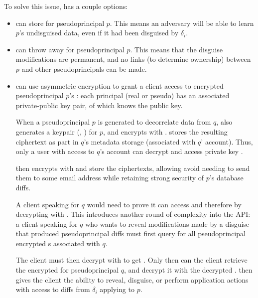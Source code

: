 To solve this issue, \sys has a couple options:
\begin{itemize}
    \item \sys can store  for pseudoprincipal $p$. This means
        an adversary will be able to learn $p$'s undisguised data, even if it had been disguised by
        $\delta_i$.

    \item \sys can throw away  for pseudoprincipal $p$. This means that the
        disguise modifications are permanent, and no links (to determine ownership) between
        $p$ and other pseudoprincipals can be made.

    \item \sys can use asymmetric encryption to grant a client access to encrypted pseudoprincipal
        $p$'s : each principal (real or pseudo) has an associated private-public
        key pair, of which \sys knows the public key. 

        When a pseudoprincipal $p$ is generated to decorrelate data from $q$, \sys also generates a
        keypair (, ) for $p$, and encrypts  with . \sys stores the
        resulting ciphertext as part in $q$'s metadata storage (\eg associated with $q$' account).
        Thus, only a user with access to $q$'s account can decrypt and access private key .

        \sys then encrypts  with  and store the ciphertexts,
        allowing \sys avoid needing to send them to some email address while retaining strong
        security of $p$'s database diffs.

        A client speaking for $q$ would need to prove it can access  and therefore
         by decrypting  with .
        This introduces another round of complexity into the API: a client speaking for $q$ who
        wants to reveal modifications made by a disguise that produced pseudoprincipal diffs must
        first query for all pseudoprincipal encrypted s associated with $q$.

        The client must then decrypt with  to get . Only then can the client
        retrieve the encrypted  for pseudoprincipal $q$, and decrypt it with the
        decrypted .  then gives the client the ability to reveal,
        disguise, or
        perform application actions with access to diffs from $\delta_i$ applying to $p$.
\end{itemize}

